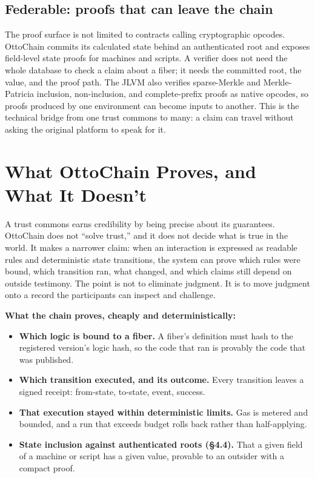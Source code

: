 \documentclass[11pt,a4paper]{article}
\begin{document}
\subsection{Federable: proofs that can leave the chain}

The proof surface is not limited to contracts calling cryptographic opcodes. OttoChain commits its calculated state behind an authenticated root and exposes field-level state proofs for machines and scripts. A verifier does not need the whole database to check a claim about a fiber; it needs the committed root, the value, and the proof path. The JLVM also verifies sparse-Merkle and Merkle-Patricia inclusion, non-inclusion, and complete-prefix proofs as native opcodes, so proofs produced by one environment can become inputs to another. This is the technical bridge from one trust commons to many: a claim can travel without asking the original platform to speak for it.

\section{What OttoChain Proves, and What It Doesn't}

A trust commons earns credibility by being precise about its guarantees. OttoChain does not ``solve trust,'' and it does not decide what is true in the world. It makes a narrower claim: when an interaction is expressed as readable rules and deterministic state transitions, the system can prove which rules were bound, which transition ran, what changed, and which claims still depend on outside testimony. The point is not to eliminate judgment. It is to move judgment onto a record the participants can inspect and challenge.

\noindent\textbf{What the chain proves, cheaply and deterministically:}
\begin{itemize}
    \item \textbf{Which logic is bound to a fiber.} A fiber's definition must hash to the registered version's logic hash, so the code that ran is provably the code that was published.
    \item \textbf{Which transition executed, and its outcome.} Every transition leaves a signed receipt: from-state, to-state, event, success.
    \item \textbf{That execution stayed within deterministic limits.} Gas is metered and bounded, and a run that exceeds budget rolls back rather than half-applying.
    \item \textbf{State inclusion against authenticated roots (\S4.4).} That a given field of a machine or script has a given value, provable to an outsider with a compact proof.
\end{itemize}
\end{document}
